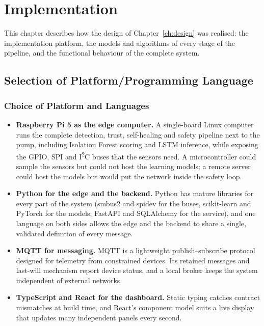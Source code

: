 \chapter{Implementation}
\label{ch:implementation}

This chapter describes how the design of Chapter~\ref{ch:design} was realised: the implementation platform, the models and algorithms of every stage of the pipeline, and the functional behaviour of the complete system.

\section{Selection of Platform/Programming Language}

\subsection{Choice of Platform and Languages}

\begin{itemize}
  \item \textbf{Raspberry Pi 5 as the edge computer.} A single-board Linux computer runs the complete detection, trust, self-healing and safety pipeline next to the pump, including Isolation Forest scoring and LSTM inference, while exposing the GPIO, SPI and I\textsuperscript{2}C buses that the sensors need. A microcontroller could sample the sensors but could not host the learning models; a remote server could host the models but would put the network inside the safety loop.
  \item \textbf{Python for the edge and the backend.} Python has mature libraries for every part of the system (smbus2 and spidev for the buses, scikit-learn and PyTorch for the models, FastAPI and SQLAlchemy for the service), and one language on both sides allows the edge and the backend to share a single, validated definition of every message.
  \item \textbf{MQTT for messaging.} MQTT is a lightweight publish--subscribe protocol designed for telemetry from constrained devices. Its retained messages and last-will mechanism report device status, and a local broker keeps the system independent of external networks.
  \item \textbf{TypeScript and React for the dashboard.} Static typing catches contract mismatches at build time, and React's component model suits a live display that updates many independent panels every second.
\end{itemize}

